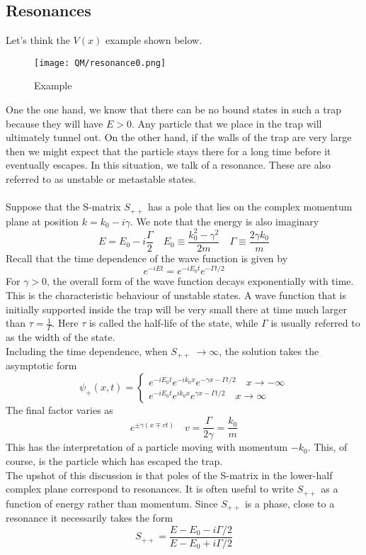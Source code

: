 \subsection{Resonances}
Let's think the $V(x)$ example shown below.
\begin{figure}[!h]
\centering
\texttt{[image: QM/resonance0.png]}
\caption{Example}
\end{figure} 
One the one hand, we know that there can be no bound states in such a trap because they will have $E > 0$. 
Any particle that we place in the trap will ultimately tunnel out. 
On the other hand, if the walls of the trap are very large then we might expect that the particle stays there for a long time before it eventually escapes. 
In this situation, we talk of a resonance. These are also referred to as unstable or metastable states.
\\ \\
Suppose that the S-matrix $S_{++}$ has a pole that lies on the complex momentum plane at position $k = k_0 - i\gamma$. We note that the energy is also imaginary
\[E = E_0 - i\frac{\Gamma}{2} \quad E_0 \equiv \frac{k_0^2-\gamma^2}{2m} \quad \Gamma \equiv \frac{2\gamma k_0}{m}\]
Recall that the time dependence of the wave function is given by
\[e^{-iEt} = e^{-iE_0t}e^{-\Gamma t/2}\]
For $\gamma > 0$, the overall form of the wave function decays exponentially with time. This is the characteristic behaviour of unstable states. 
A wave function that is initially supported inside the trap will be very small there at time much larger than $\tau = \frac{1}{\Gamma}$. Here $\tau$ is called the half-life of the state, while $\Gamma$ is usually referred to as the width of the state.
\\
Including the time dependence, when $S_{++}\ \to \infty$, the solution takes the asymptotic form
\[\psi_+(x,t) = \begin{cases} e^{-iE_0t}e^{-ik_0x}e^{-\gamma x - \Gamma t/2} \quad x\to -\infty \\  e^{-iE_0t}e^{ik_0x}e^{\gamma x - \Gamma t/2} \quad x\to \infty \end{cases}\]
The final factor varies as
\[e^{\pm\gamma(x\mp vt)} \quad v = \frac{\Gamma}{2\gamma} = \frac{k_0}{m}\]
This has the interpretation of a particle moving with momentum $-k_0$. This, of course, is the particle which has escaped the trap.
\\
The upshot of this discussion is that poles of the S-matrix in the lower-half complex plane correspond to resonances. It is often useful to write $S_{++}$ as a function of energy rather than momentum. Since $S_{++}$ is a phase, close to a resonance it necessarily takes the form
\[S_{++} = \frac{E-E_0-i\Gamma/2}{E-E_0+i\Gamma/2}\]


